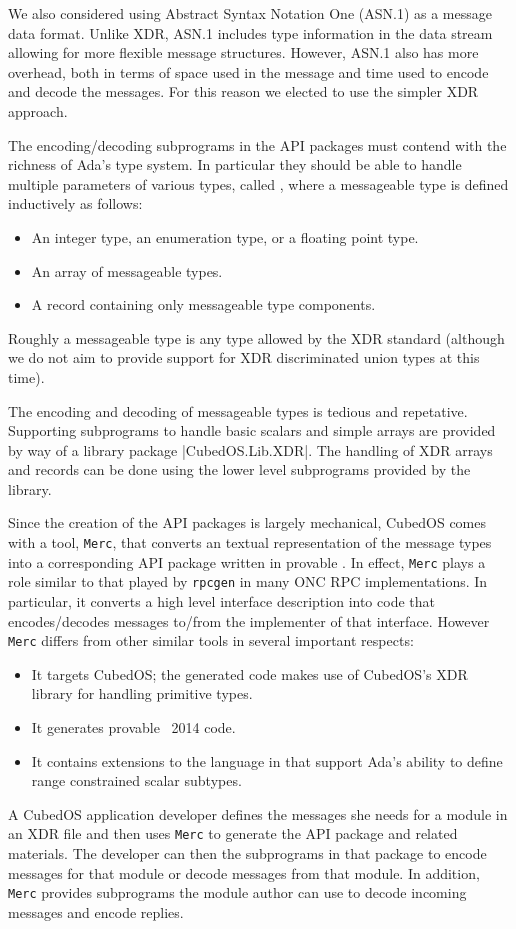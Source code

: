 We also considered using Abstract Syntax Notation One (ASN.1) \cite{asn.1} as a message data
format. Unlike XDR, ASN.1 includes type information in the data stream allowing for more
flexible message structures. However, ASN.1 also has more overhead, both in terms of space used
in the message and time used to encode and decode the messages. For this reason we elected to
use the simpler XDR approach.

The encoding/decoding subprograms in the API packages must contend with the richness of Ada's
type system. In particular they should be able to handle multiple parameters of various types,
called , where a messageable type is defined inductively as follows:

\begin{itemize}
\item An integer type, an enumeration type, or a floating point type.
\item An array of messageable types.
\item A record containing only messageable type components.
\end{itemize}

Roughly a messageable type is any type allowed by the XDR standard (although we do not aim to
provide support for XDR discriminated union types at this time).

The encoding and decoding of messageable types is tedious and repetative. Supporting subprograms
to handle basic scalars and simple arrays are provided by way of a library package
|CubedOS.Lib.XDR|. The handling of XDR arrays and records can be done using the lower level
subprograms provided by the library.

Since the creation of the API packages is largely mechanical, CubedOS comes with a tool,
\texttt{Merc}, that converts an textual representation of the message types into a corresponding
API package written in provable \SPARK. In effect, \texttt{Merc} plays a role similar to that
played by \texttt{rpcgen} in many ONC RPC \cite{rfc-5531} implementations. In particular, it
converts a high level interface description into code that encodes/decodes messages to/from the
implementer of that interface. However \texttt{Merc} differs from other similar tools in several
important respects:

\begin{itemize}
\item It targets CubedOS; the generated code makes use of CubedOS's XDR library for handling
  primitive types.
\item It generates provable \SPARK\ 2014 code.
\item It contains extensions to the language in \cite{rfc-4506} that support Ada's ability to
  define range constrained scalar subtypes.
\end{itemize}

A CubedOS application developer defines the messages she needs for a module in an XDR file and
then uses \texttt{Merc} to generate the API package and related materials. The developer can
then the subprograms in that package to encode messages for that module or decode messages from
that module. In addition, \texttt{Merc} provides subprograms the module author can use to decode
incoming messages and encode replies.
